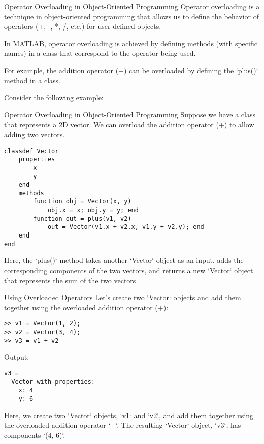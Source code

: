 \documentclass[handout]{beamer}
\begin{document}
\begin{frame}[fragile]{Operator Overloading in Object-Oriented Programming}
Operator overloading is a technique in object-oriented programming that allows us to define the behavior of operators (+, -, *, /, etc.) for user-defined objects.

In MATLAB, operator overloading is achieved by defining methods (with specific names) in a class that correspond to the operator being used.

For example, the addition operator (+) can be overloaded by defining the `plus()` method in a class. 

Consider the following example:
\end{frame}


\begin{frame}[fragile]{Operator Overloading in Object-Oriented Programming}
Suppose we have a class that represents a 2D vector. We can overload the addition operator (+) to allow adding two vectors.

\begin{lstlisting}[style=matlab]
classdef Vector
    properties
        x
        y
    end
    methods
        function obj = Vector(x, y)
            obj.x = x; obj.y = y; end
        function out = plus(v1, v2)
            out = Vector(v1.x + v2.x, v1.y + v2.y); end
    end
end

\end{lstlisting}

Here, the `plus()` method takes another `Vector` object as an input, adds the corresponding components of the two vectors, and returns a new `Vector` object that represents the sum of the two vectors.
\end{frame}

\begin{frame}[fragile]{Using Overloaded Operators}
Let's create two `Vector` objects and add them together using the overloaded addition operator (+):

\begin{lstlisting}[style=matlab]
>> v1 = Vector(1, 2);
>> v2 = Vector(3, 4);
>> v3 = v1 + v2
\end{lstlisting}

Output: \begin{verbatim}v3 = 
  Vector with properties:
    x: 4
    y: 6\end{verbatim}

Here, we create two `Vector` objects, `v1` and `v2`, and add them together using the overloaded addition operator `+`. The resulting `Vector` object, `v3`, has components `(4, 6)`.

\end{frame}
\end{document}
